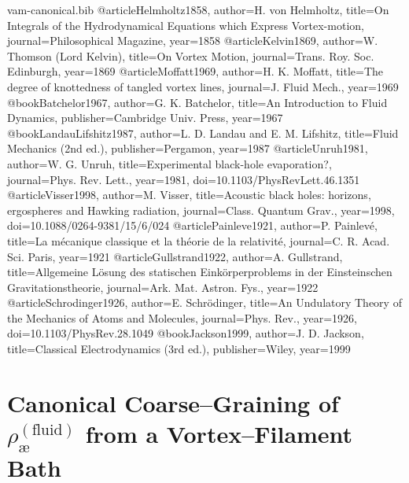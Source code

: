 \documentclass[11pt, a4paper]{article}
\begin{document}
    \begin{filecontents*}{vam-canonical.bib}
        @article{Helmholtz1858, author={H. von Helmholtz}, title={On Integrals of the Hydrodynamical Equations which Express Vortex-motion}, journal={Philosophical Magazine}, year={1858}}
        @article{Kelvin1869, author={W. Thomson (Lord Kelvin)}, title={On Vortex Motion}, journal={Trans. Roy. Soc. Edinburgh}, year={1869}}
        @article{Moffatt1969, author={H. K. Moffatt}, title={The degree of knottedness of tangled vortex lines}, journal={J. Fluid Mech.}, year={1969}}
        @book{Batchelor1967, author={G. K. Batchelor}, title={An Introduction to Fluid Dynamics}, publisher={Cambridge Univ. Press}, year={1967}}
        @book{LandauLifshitz1987, author={L. D. Landau and E. M. Lifshitz}, title={Fluid Mechanics (2nd ed.)}, publisher={Pergamon}, year={1987}}
        @article{Unruh1981, author={W. G. Unruh}, title={Experimental black-hole evaporation?}, journal={Phys. Rev. Lett.}, year={1981}, doi={10.1103/PhysRevLett.46.1351}}
        @article{Visser1998, author={M. Visser}, title={Acoustic black holes: horizons, ergospheres and Hawking radiation}, journal={Class. Quantum Grav.}, year={1998}, doi={10.1088/0264-9381/15/6/024}}
        @article{Painleve1921, author={P. Painlev{\'e}}, title={La m{\'e}canique classique et la th{\'e}orie de la relativit{\'e}}, journal={C. R. Acad. Sci. Paris}, year={1921}}
        @article{Gullstrand1922, author={A. Gullstrand}, title={Allgemeine L{\"o}sung des statischen Eink{\"o}rperproblems in der Einsteinschen Gravitationstheorie}, journal={Ark. Mat. Astron. Fys.}, year={1922}}
        @article{Schrodinger1926, author={E. Schr{\"o}dinger}, title={An Undulatory Theory of the Mechanics of Atoms and Molecules}, journal={Phys. Rev.}, year={1926}, doi={10.1103/PhysRev.28.1049}}
        @book{Jackson1999, author={J. D. Jackson}, title={Classical Electrodynamics (3rd ed.)}, publisher={Wiley}, year={1999}}
    \end{filecontents*}
    


\section{Canonical Coarse–Graining of \(\rho_{\text{\ae}}^{(\text{fluid})}\) from a Vortex–Filament Bath}
\label{sec:canon_rhoae_from_filaments}
\end{document}
